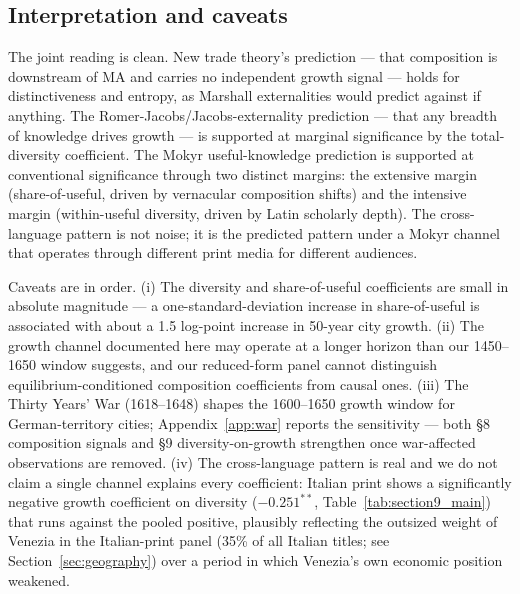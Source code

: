 
\subsection{Interpretation and caveats}
\label{subsec:interpretation}

The joint reading is clean. New trade theory's prediction --- that
composition is downstream of MA and carries no independent growth
signal --- holds for distinctiveness and entropy, as Marshall
externalities would predict against if anything. The
Romer-Jacobs/Jacobs-externality prediction --- that any breadth of
knowledge drives growth --- is supported at marginal significance by
the total-diversity coefficient. The Mokyr useful-knowledge prediction
is supported at conventional significance through two distinct margins:
the extensive margin (share-of-useful, driven by vernacular composition
shifts) and the intensive margin (within-useful diversity, driven by
Latin scholarly depth). The cross-language pattern is not noise; it is
the predicted pattern under a Mokyr channel that operates through
different print media for different audiences.

Caveats are in order. (i) The diversity and share-of-useful coefficients
are small in absolute magnitude --- a one-standard-deviation increase
in share-of-useful is associated with about a 1.5 log-point increase
in 50-year city growth. (ii) The growth channel documented here may
operate at a longer horizon than our 1450--1650 window suggests, and
our reduced-form panel cannot distinguish equilibrium-conditioned
composition coefficients from causal ones. (iii) The Thirty Years' War
(1618--1648) shapes the 1600--1650 growth window for German-territory
cities; Appendix~\ref{app:war} reports the sensitivity --- both §8
composition signals and §9 diversity-on-growth strengthen once
war-affected observations are removed. (iv) The cross-language pattern
is real and we do not claim a single channel explains every
coefficient: Italian print shows a significantly negative growth
coefficient on diversity ($-0.251^{**}$,
Table~\ref{tab:section9_main}) that runs against the pooled positive,
plausibly reflecting the outsized weight of Venezia in the
Italian-print panel (35\% of all Italian titles; see
Section~\ref{sec:geography}) over a period in which Venezia's own
economic position weakened.
